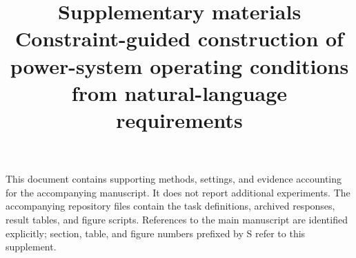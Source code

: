 \documentclass[11pt,a4paper]{article}
\title{Supplementary materials\\\large Constraint-guided construction of power-system operating conditions from natural-language requirements}
\author{}
\date{}
\begin{document}
\maketitle
This document contains supporting methods, settings, and evidence accounting for the accompanying manuscript. It does not report additional experiments. The accompanying repository files contain the task definitions, archived responses, result tables, and figure scripts. References to the main manuscript are identified explicitly; section, table, and figure numbers prefixed by S refer to this supplement.
\tableofcontents

\end{document}
